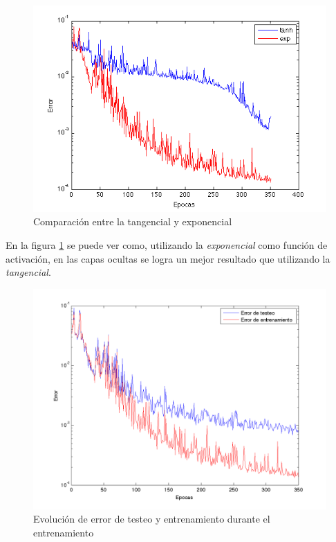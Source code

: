 \documentclass{sig-alternate}
\begin{document}
	\begin{figure}[!ht]
		\includegraphics[scale=0.5]{./figures/tanVsExp.png}
	  	\caption{Comparación entre la tangencial y exponencial}
	  	\label{fig:tanVsExp}
	\end{figure}

	En la figura \ref{fig:tanVsExp} se puede ver como, utilizando la \textit{exponencial} como función de activación, en las capas ocultas se logra un mejor resultado que utilizando la \textit{tangencial}.

\newpage
\onecolumn

\begin{figure}[!ht]
	\includegraphics[scale=0.8]{./figures/mejorErrores.png}
  \caption{Evolución de error de testeo y entrenamiento durante el entrenamiento}
  \label{fig:errorsByEpochs}
\end{figure}
\end{document}
